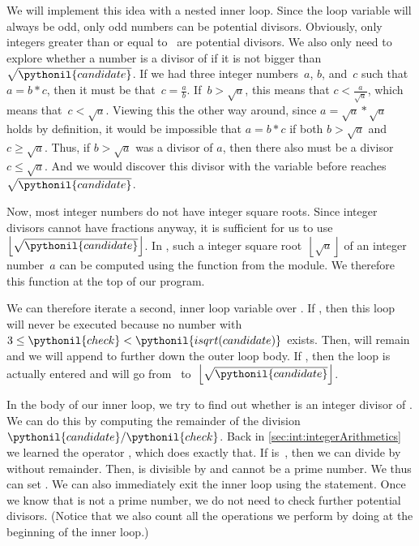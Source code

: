 We will implement this idea with a nested inner loop.
Since the loop variable  will always be odd, only odd numbers can be potential divisors.
Obviously, only integers greater than or equal to~ are potential divisors.
We also only need to explore whether a number  is a divisor of  if it is not bigger than $\sqrt{\pythonil{candidate}}$.
If we had three integer numbers~$a$, $b$, and~$c$ such that $a=b*c$, then it must be that~$c=\frac{a}{b}$.
If~$b>\sqrt{a}$, this means that $c<\frac{a}{\sqrt{a}}$, which means that~$c<\sqrt{a}$.
Viewing this the other way around, since $a=\sqrt{a}*\sqrt{a}$ holds by definition, it would be impossible that $a=b*c$ if both $b>\sqrt{a}$ and $c\geq\sqrt{a}$.
Thus, if $b>\sqrt{a}$ was a divisor of $a$, then there also must be a divisor $c\leq\sqrt{a}$.
And we would discover this divisor with the variable  before  reaches~$\sqrt{\pythonil{candidate}}$.

Now, most integer numbers do not have integer square roots.
Since integer divisors cannot have fractions anyway, it is sufficient for us to use $\left\lfloor\sqrt{\pythonil{candidate}}\right\rfloor$.
In \python, such a  integer square root~$\left\lfloor\sqrt{a}\right\rfloor$ of an integer number~$a$ can be computed using the  function from the  module.
We therefore  this function at the top of our program.%
%
\begin{sloppypar}%
We can therefore iterate a second, inner loop variable  over .
If , then this loop will never be executed because no number  with $3\leq\pythonil{check}<\pythonil{isqrt(candidate)}$ exists.
Then,  will remain  and we will append  to  further down the outer loop body.
If , then the loop is actually entered and  will go from~ to~$\left\lfloor\sqrt{\pythonil{candidate}}\right\rfloor$.%
\end{sloppypar}%
%
In the body of our inner loop, we try to find out whether  is an integer divisor of .
We can do this by computing the remainder of the division~$\pythonil{candidate}/\pythonil{check}$.
Back in \cref{sec:int:integerArithmetics} we learned the  operator \expandafter\pythonilIdx{\%}, which does exactly that.
If  is~, then we can divide  by  without remainder.
Then,  is divisible by  and cannot be a prime number.
We thus can set .
We can also immediately exit the inner loop using the  statement.
Once we know that  is not a prime number, we do not need to check further potential divisors.
(Notice that we also count all the  operations we perform by doing  at the beginning of the inner loop.)

